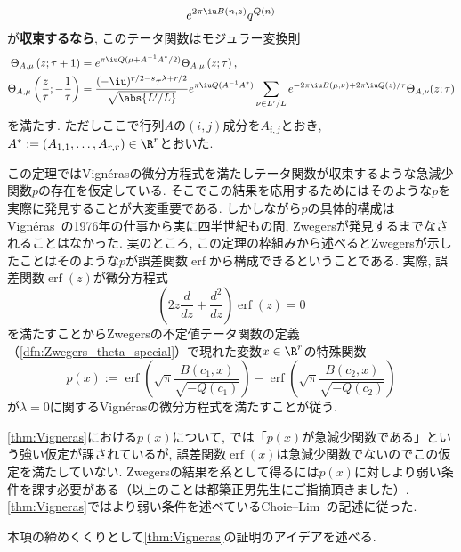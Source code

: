 \documentclass[11pt,b5paper,oneside,lualatex]{ltjsarticle} %
\DeclareMathOperator{\erf}{erf}
\numberwithin{equation}{section} %
\begin{document}
\begin{thm}
\[	e^{2\pi\iu B(n, z)} q^{Q(n)}
	\]
	が\textbf{収束するなら}, このテータ関数はモジュラー変換則
	\begin{align}
		\Theta_{A, \mu} \left( z; \tau + 1 \right)
		&=
		e^{\pi\iu Q( \mu + A^{-1} A^* / 2)}
		\Theta_{A, \mu} \left( z; \tau \right),
		\\
		\Theta_{A, \mu} \left( \frac{z}{\tau}; -\frac{1}{\tau} \right)
		&=
		\frac{(-\iu)^{r/2 - s} \tau^{\lambda + r/2}}{\sqrt{\abs{L'/L}}}
		e^{\pi\iu Q(A^{-1} A^*)}
		\sum_{\nu \in L'/L} e^{-2\pi\iu B(\mu, \nu) + 2\pi\iu Q(z) / \tau } 
		\Theta_{A, \nu} (z; \tau)
	\end{align}
	を満たす. 
	ただしここで行列$ A $の$ (i, j) $成分を$ A_{i, j} $とおき, $ A^* := (A_{1, 1}, \dots, A_{r, r}) \in \R^r $とおいた. 
\end{thm}

この定理ではVign\'{e}rasの微分方程式を満たしテータ関数が収束するような急減少関数$ p $の存在を仮定している. 
そこでこの結果を応用するためにはそのような$ p $を実際に発見することが大変重要である.
しかしながら$ p $の具体的構成はVign\'{e}ras~\cite{Vigneras}の1976年の仕事から実に四半世紀もの間, Zwegersが発見するまでなされることはなかった.
実のところ, この定理の枠組みから述べるとZwegersが示したことはそのような$ p $が誤差関数$ \erf $から構成できるということである. 
実際, 誤差関数$ \erf(z) $が微分方程式
\[
\left( 2 z \frac{d}{dz} + \frac{d^2}{dz} \right) \erf(z) = 0
\]
を満たすことからZwegersの不定値テータ関数の定義（\cref{dfn:Zwegers_theta_special}）で現れた変数$ x \in \R^r $の特殊関数
\[
p(x) :=
\erf \left( \sqrt{\pi} \frac{B(c_1, x)}{\sqrt{-Q(c_1)}} \right) - \erf \left( \sqrt{\pi} \frac{B(c_2, x)}{\sqrt{-Q(c_2)}} \right)
\]
が$ \lambda = 0 $に関するVign\'{e}rasの微分方程式を満たすことが従う. 

\begin{rem}
	\cref{thm:Vigneras}における$ p(x) $について, \cite[Theorem 8.27]{BFOR}では「$ p(x) $が急減少関数である」という強い仮定が課されているが, 誤差関数$ \erf(x) $は急減少関数でないのでこの仮定を満たしていない.
	Zwegersの結果を系として得るには$ p(x) $に対しより弱い条件を課す必要がある（以上のことは都築正男先生にご指摘頂きました）.
	\cref{thm:Vigneras}ではより弱い条件を述べているChoie--Lim~\cite[Theorem 3.1]{Choie_Lim}の記述に従った.
\end{rem}

本項の締めくくりとして\cref{thm:Vigneras}の証明のアイデアを述べる. 
\end{document}
